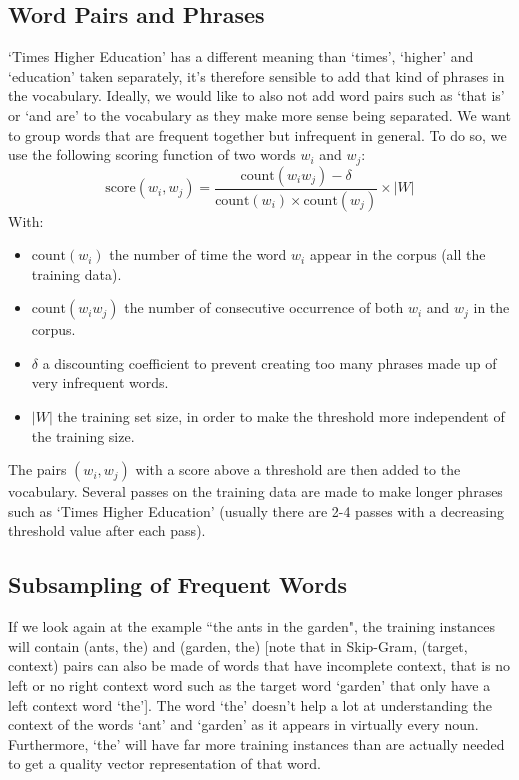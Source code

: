 \subsection{Word Pairs and Phrases}
`Times Higher Education' has a different meaning than `times', `higher' and `education' taken separately, it's therefore sensible to add that kind of phrases in the vocabulary. Ideally, we would like to also not add word pairs such as `that is' or `and are' to the vocabulary as they make more sense being separated. We want to group words that are frequent together but infrequent in general. To do so, we use the following scoring function of two words $w_i$ and $w_j$:
\begin{equation}
    \text{score}(w_i, w_j) = \frac{\text{count}(w_iw_j) - \delta}{\text{count}(w_i)\times \text{count}(w_j)}\times |W|
\end{equation}
With: 
\begin{itemize}[topsep=0pt]
    \item $\text{count}(w_i)$ the number of time the word $w_i$ appear in the corpus (all the training data).
    \item $\text{count}(w_iw_j)$ the number of consecutive occurrence of both $w_i$ and $w_j$ in the corpus. 
    \item $\delta$ a discounting coefficient to prevent creating too many phrases made up of very infrequent words.
    \item $|W|$ the training set size, in order to make the threshold more independent of the training size.
\end{itemize}

The pairs $(w_i, w_j)$ with a score above a threshold are then added to the vocabulary. Several passes on the training data are made to make longer phrases such as `Times Higher Education' (usually there are 2-4 passes with a decreasing threshold value after each pass).

\subsection{Subsampling of Frequent Words}
If we look again at the example ``the ants in the garden", the training instances will contain (ants, the) and (garden, the) [note that in Skip-Gram, (target, context) pairs can also be made of words that have incomplete context, that is no left or no right context word such as the target word `garden' that only have a left context word `the']. The word `the' doesn't help a lot at understanding the context of the words `ant' and `garden' as it appears in virtually every noun. Furthermore, `the' will have far more training instances than are actually needed to get a quality vector representation of that word.

